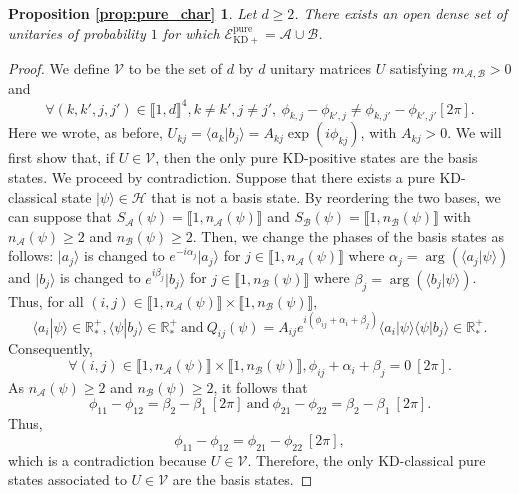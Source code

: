 \documentclass[a4paper, notitlepage, 11pt]{article}
\numberwithin{equation}{section}
\newcommand{\cket}[1]{|#1\rangle}
\newcommand{\bracket}[2]{\langle #1|#2\rangle}
\newcommand{\mcl}[1]{\mathcal{#1}}
\newcommand{\Acal}{{\mathcal A}}
\newcommand{\Bcal}{{\mathcal B}}
\newcommand{\EcalKDCpu}{{\mathcal E}_{\mathrm{KD+}}^{\mathrm{pure}}}
\newcommand{\R}{\mathbb{R}}
\newcommand{\mab}{m_{\Acal,\Bcal}}
\renewcommand{\H}{\mathcal{H}}
\newcommand{\IntEnt}[2]{\llbracket #1 , #2 \rrbracket}
\newtheorem*{propIntro}{Proposition \ref{prop:pure_char}}
\begin{document}
\begin{propIntro}
Let $d\geq2$.
There exists an open dense set of unitaries of probability $1$ for which $\EcalKDCpu=\Acal\cup\Bcal$.
\end{propIntro}
\begin{proof}
We define $\mcl{V}$ to be the set of $d$ by $d$ unitary matrices $U$ satisfying $\mab > 0$ and 
\begin{equation}\label{eq:proof_pure_char}
\forall   (k,k',j,j')\in \IntEnt{1}{d}^4, k\neq k', j\neq j', \  \phi_{k,j} -  \phi_{k',j} \neq  \phi_{k,j'} -  \phi_{k',j'} [2\pi].
\end{equation}
Here we wrote, as before, $U_{kj}=\langle a_k|b_j\rangle=A_{kj}\exp(i\phi_{kj})$, with $A_{kj}>0$. 
We will first show that, if $U\in\mcl{V}$, then the only pure KD-positive states are the basis states. We proceed by contradiction.  Suppose that there exists  a pure KD-classical state $\cket{\psi}\in\H$ that is not a basis state. By reordering the two bases, we can suppose that $S_{\Acal}(\psi)=\IntEnt{1}{n_{\Acal}(\psi)}$ and $S_{\Bcal}(\psi)=\IntEnt{1}{n_{\Bcal}(\psi)}$ with $n_{\Acal}(\psi) \geqslant 2$ and $n_{\Bcal}(\psi) \geqslant 2$.
Then, we change the phases of the basis states as follows: $\cket{a_j}$ is changed to $e^{-i\alpha_j}\cket{a_j}$ for $j\in\IntEnt{1}{n_{\Acal}(\psi)}$ where $\alpha_j=\arg(\bracket{a_j}{\psi})$ and  $\cket{b_j}$ is changed to $e^{i\beta_j}\cket{b_j}$ for $j\in\IntEnt{1}{n_{\Bcal}(\psi)}$ where $\beta_j=\arg(\bracket{b_j}{\psi})$. Thus, for all $(i,j)\in\IntEnt{1}{n_{\Acal}(\psi)}\times\IntEnt{1}{n_{\Bcal}(\psi)}$,
\[
 \bracket{a_i}{\psi}\in\R^{+}_*, \bracket{\psi}{b_j}\in\R^{+}_* \ \mathrm{ and } \ Q_{ij}(\psi)=A_{ij}e^{i(\phi_{ij}+\alpha_i+\beta_j)} \bracket{a_i}{\psi}\bracket{\psi}{b_j}\in\R^{+}_*.
\]
Consequently, 
\[
\forall (i,j)\in\IntEnt{1}{n_{\Acal}(\psi)}\times\IntEnt{1}{n_{\Bcal}(\psi)}, \phi_{ij}+\alpha_i+\beta_j = 0~[2\pi].
\]
As $n_{\Acal}(\psi) \geqslant 2$ and $n_{\Bcal}(\psi) \geqslant 2$, it follows that
\[
\phi_{11} - \phi_{12} = \beta_2 - \beta_1 ~[2\pi] \ \mathrm{ and } \ \phi_{21} - \phi_{22} = \beta_2 - \beta_1 ~[2\pi].
\]
Thus,
\[
\phi_{11} - \phi_{12} =\phi_{21} - \phi_{22} ~[2\pi],
\]
which is a contradiction because $U\in\mcl{V}$. Therefore, the only KD-classical pure states associated to $U\in\mcl{V}$ are the basis states.


\end{proof}
\end{document}
